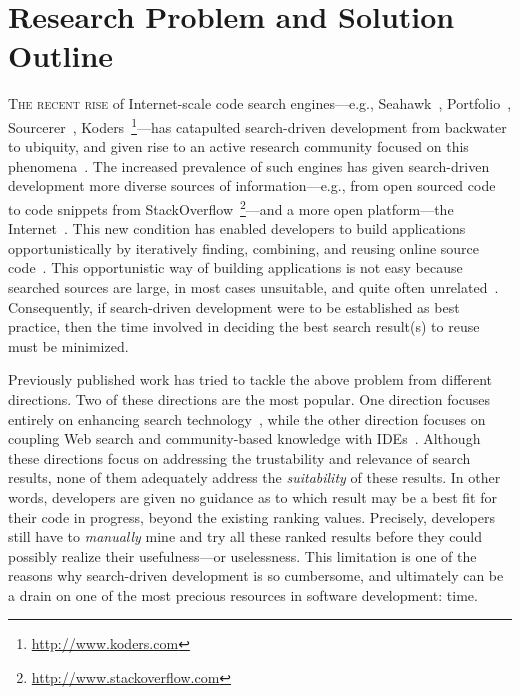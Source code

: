 \documentclass[conference]{IEEEtran}
\begin{document}
\section{Research Problem and Solution Outline}
\label{sec:intro}
\lettrine[lraise=0.1, nindent=0em, slope=-.5em]{T} {he recent rise} of Internet-scale code search engines---e.g., Seahawk~\cite{Bacchelli:2012dl}, Portfolio~\cite{McMillan:2011wq}, Sourcerer~\cite{Bajracharya:2006vn}, Koders~\footnote{\url{http://www.koders.com}}---has catapulted search-driven development from backwater to ubiquity, and given rise to an active research community focused on this phenomena~\cite{Bajracharya:2009fj, Bajracharya:2010iy, Bajracharya:2011kw}. The increased prevalence of such engines has given search-driven development more diverse sources of information---e.g., from open sourced code to code snippets from StackOverflow~\footnote{\url{http://www.stackoverflow.com}}---and a more open platform---the Internet~\cite{GallardoValencia:2009gr, GallardoValencia:2010ij, Ying:2012tr}. This new condition has enabled developers to build applications opportunistically by iteratively finding, combining, and reusing online source code~\cite{Brandt:2008wi, Brandt:2009jb, Ying:2012tr}. This opportunistic way of building applications is not easy because searched sources are large, in most cases unsuitable, and quite often unrelated~\cite{GallardoValencia:2009gr}. Consequently, if search-driven development were to be established as best practice, then the time involved in deciding the best search result(s) to reuse must be minimized.

Previously published work has tried to tackle the above problem from different directions. Two of these directions are the most popular. One direction focuses entirely on enhancing search technology~\cite{Bajracharya:2010um, Gysin:2010kt, Mandelin:2005uj, McMillan:2011cm, McMillan:2012dj}, while the other direction focuses on coupling Web search and community-based knowledge with IDEs~\cite{Bacchelli:2012dl, Brandt:2010tp, Hartmann:2010hx, Hoffmann:2007wo, Wightman:2012gc}. Although these directions focus on addressing the trustability and relevance of search results, none of them adequately address the \emph{suitability} of these results. In other words, developers are given no guidance as to which result may be a best fit for their code in progress, beyond the existing ranking values. Precisely, developers still have to \emph{manually} mine and try all these ranked results before they could possibly realize their usefulness---or uselessness. This limitation is one of the reasons why search-driven development is so cumbersome, and ultimately can be a drain on one of the most precious resources in software development: time. 
\end{document}
